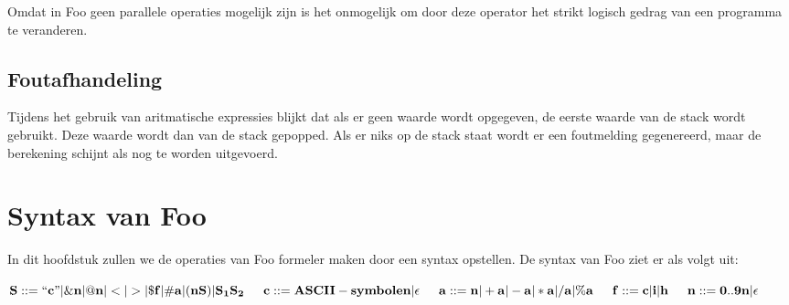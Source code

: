 \documentclass[11pt]{article}
\begin{document}
Omdat in Foo geen parallele operaties mogelijk zijn is het onmogelijk om door deze operator het strikt logisch gedrag van een programma te veranderen.

\subsection{Foutafhandeling} %

Tijdens het gebruik van aritmatische expressies blijkt dat als er geen waarde wordt opgegeven, de eerste waarde van de stack wordt gebruikt. 
Deze waarde wordt dan van de stack gepopped. 
Als er niks op de stack staat wordt er een foutmelding gegenereerd, maar de berekening schijnt als nog te worden uitgevoerd.

\section{Syntax van Foo}
In dit hoofdstuk zullen we de operaties van Foo formeler maken door een syntax opstellen. 
De syntax van Foo ziet er als volgt uit:
\newline

\begin{math}
{\bf S::= ``c" | \&n | @n | < | > | \$f | \#a | (nS) | S_{1}S_{2} }
\newline
\newline
\indent{\bf c::= ASCII-symbolen| \epsilon}
\newline
\indent{\bf a::= n | +a | -a | *a | /a | \%a}
\newline 
\indent{\bf f::= c | i | h}
\newline
\indent{\bf n::= 0..9n | \epsilon}
\end{math}
\end{document}

